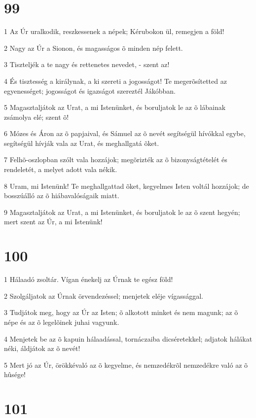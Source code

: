 \chapter{99}

\par 1 Az Úr uralkodik, reszkessenek a népek; Kérubokon ül, remegjen a föld!
\par 2 Nagy az Úr a Sionon, és magasságos õ minden nép felett.
\par 3 Tiszteljék a te nagy és rettenetes nevedet, - szent az!
\par 4 És tisztesség a királynak, a ki szereti a jogosságot! Te megerõsítetted az egyenességet; jogosságot és igazságot szereztél Jákóbban.
\par 5 Magasztaljátok az Urat, a mi Istenünket, és boruljatok le az õ lábainak zsámolya elé; szent õ!
\par 6 Mózes és Áron az õ papjaival, és Sámuel az õ nevét segítségül hívókkal egybe, segítségül hívják vala az Urat, és meghallgatá õket.
\par 7 Felhõ-oszlopban szólt vala hozzájok; megõrizték az õ bizonyságtételét és rendeletét, a melyet adott vala nékik.
\par 8 Uram, mi Istenünk! Te meghallgattad õket, kegyelmes Isten voltál hozzájok; de bosszúálló az õ hiábavalóságaik miatt.
\par 9 Magasztaljátok az Urat, a mi Istenünket, és boruljatok le az õ szent hegyén; mert szent az Úr, a mi Istenünk!

\chapter{100}

\par 1 Hálaadó zsoltár. Vígan énekelj az Úrnak te egész föld!
\par 2 Szolgáljatok az Úrnak örvendezéssel; menjetek eléje vígassággal.
\par 3 Tudjátok meg, hogy az Úr az Isten; õ alkotott minket és nem magunk; az õ népe és az õ legelõinek juhai vagyunk.
\par 4 Menjetek be az õ kapuin hálaadással, tornáczaiba dicséretekkel; adjatok hálákat néki, áldjátok az õ nevét!
\par 5 Mert jó az Úr, örökkévaló az õ kegyelme, és nemzedékrõl nemzedékre való az õ hûsége!

\chapter{101}

